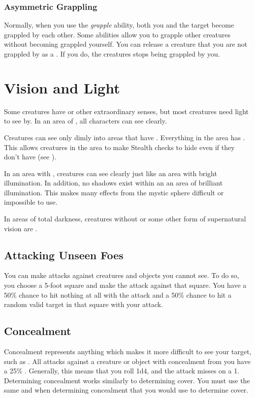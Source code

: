         \subsubsection{Asymmetric Grappling}\label{Asymmetric Grappling}
            Normally, when you use the \textit{grapple} ability, both you and the target become grappled by each other.
            Some abilities allow you to grapple other creatures without becoming grappled yourself.
            You can release a creature that you are not grappled by as a .
            If you do, the creatures stops being grappled by you.

\section{Vision and Light}\label{Vision and Light}
    Some creatures have  or other extraordinary senses, but most creatures need light to see by. 
    In an area of , all characters can see clearly.

    Creatures can see only dimly into areas that have .
    Everything in the area has .
    This allows creatures in the area to make Stealth checks to hide even if they don't have  (see ).

    In an area with , creatures can see clearly just like an area with bright illumination.
    In addition, no shadows exist within an an area of brilliant illumination.
    This makes many effects from the  mystic sphere difficult or impossible to use.

    In areas of total darkness, creatures without  or some other form of supernatural vision are \blinded.

    \subsection{Attacking Unseen Foes}
        You can make  attacks against creatures and objects you cannot see.
        To do so, you choose a 5-foot square and make the attack against that square.
        You have a 50\% chance to hit nothing at all with the attack and a 50\% chance to hit a random valid target in that square with your attack.

    \subsection{Concealment}\label{Concealment}
        Concealment represents anything which makes it more difficult to see your target, such as .
        All  attacks against a creature or object with concealment from you have a 25\% .
        Generally, this means that you roll 1d4, and the attack misses on a 1.
        Determining concealment works similarly to determining cover.
        You must use the same  and  when determining concealment that you would use to determine cover.

